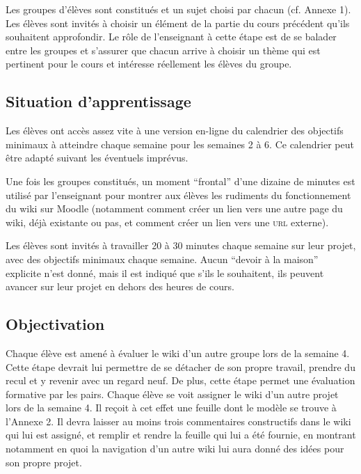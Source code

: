 \documentclass[11pt,bibliography=totoc]{scrartcl}
\begin{document}
Les groupes d'élèves sont constitués et un sujet choisi par chacun (cf. Annexe
1). Les élèves sont invités à choisir un élément de la partie du cours précédent
qu'ils souhaitent approfondir. Le rôle de l'enseignant à cette étape est de se
balader entre les groupes et s'assurer que chacun arrive à choisir un thème qui
est pertinent pour le cours et intéresse réellement les élèves du groupe.

\subsection{Situation d'apprentissage}
Les élèves ont accès assez vite à une version en-ligne du calendrier des
objectifs minimaux à atteindre chaque semaine pour les semaines 2 à 6. Ce
calendrier peut être adapté suivant les éventuels imprévus.

Une fois les groupes constitués, un moment ``frontal'' d'une dizaine de minutes
est utilisé par l'enseignant pour montrer aux élèves les rudiments du
fonctionnement du wiki sur Moodle (notamment comment créer un lien vers une
autre page du wiki, déjà existante ou pas, et comment créer un lien vers une
\textsc{url} externe).

Les élèves sont invités à travailler 20 à 30 minutes chaque semaine sur leur
projet, avec des objectifs minimaux chaque semaine. Aucun ``devoir à la maison''
explicite n'est donné, mais il est indiqué que s'ils le souhaitent, ils peuvent
avancer sur leur projet en dehors des heures de cours.

\subsection{Objectivation}
Chaque élève est amené à évaluer le wiki d'un autre groupe lors de la semaine
4. Cette étape devrait lui permettre de se détacher de son propre travail,
prendre du recul et y revenir avec un regard neuf. De plus, cette étape permet
une évaluation formative par les pairs. Chaque élève se voit assigner le wiki
d'un autre projet lors de la semaine 4. Il reçoit à cet effet une feuille dont
le modèle se trouve à l'Annexe 2. Il devra laisser au moins trois commentaires
constructifs dans le wiki qui lui est assigné, et remplir et rendre la feuille
qui lui a été fournie, en montrant notamment en quoi la navigation d'un autre
wiki lui aura donné des idées pour son propre projet.
\end{document}
